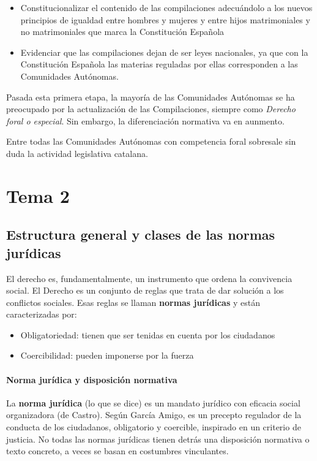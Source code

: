 \documentclass[a4paper,12pt]{report}
\begin{document}
\begin{itemize}
\item Constitucionalizar el contenido de las compilaciones adecuándolo a los nuevos
principios de igualdad entre hombres y mujeres y entre hijos matrimoniales y no
matrimoniales que marca la Constitución Española
\item Evidenciar que las compilaciones dejan de ser leyes nacionales, ya que con la 
    Constitución Española las materias reguladas por ellas corresponden a las 
    Comunidades Autónomas.
\end{itemize}

Pasada esta primera etapa, la mayoría de las Comunidades Autónomas se ha
preocupado por la actualización de las Compilaciones, siempre como \emph{Derecho
foral o especial}. Sin embargo, la diferenciación normativa va en aunmento.

Entre todas las Comunidades Autónomas con competencia foral sobresale sin duda
la actividad legislativa catalana.

\chapter{Tema 2}
\section{Estructura general y clases de las normas jurídicas}
El derecho es, fundamentalmente, un instrumento que ordena la convivencia
social. El Derecho es un conjunto de reglas que trata de dar solución a los
conflictos sociales. Esas reglas se llaman \textbf{normas jurídicas} y están
caracterizadas por:

\begin{itemize}
\item{Obligatoriedad: tienen que ser tenidas en cuenta por los ciudadanos}
\item{Coercibilidad: pueden imponerse por la fuerza}
\end{itemize}

\subsubsection{Norma jurídica y disposición normativa}

La \textbf{norma jurídica} (lo que se dice) es un mandato jurídico con eficacia
social organizadora (de Castro). Según García Amigo, es un precepto regulador de la conducta de los
ciudadanos, obligatorio y coercible, inspirado en un criterio de justicia. No
todas las normas jurídicas tienen detrás una disposición normativa o texto
concreto, a veces se basan en costumbres vinculantes.
\end{document}
